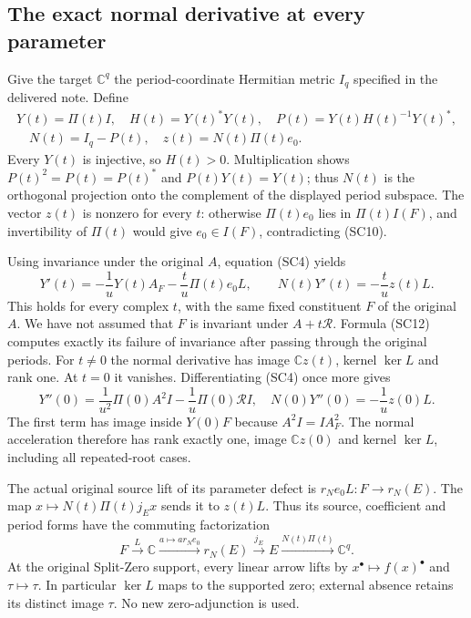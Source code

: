 \subsection{The exact normal derivative at every parameter}

Give the target $\mathbb C^q$ the period-coordinate Hermitian metric
$I_q$ specified in the delivered note.  Define
\[
 \begin{gathered}
 Y(t)=\Pi(t)I,
 \quad H(t)=Y(t)^*Y(t),
 \quad P(t)=Y(t)H(t)^{-1}Y(t)^*,\\
 \quad N(t)=I_q-P(t),
 \quad z(t)=N(t)\Pi(t)e_0.
 \end{gathered}
 \tag{SC11}
\]
Every $Y(t)$ is injective, so $H(t)>0$.  Multiplication shows
$P(t)^2=P(t)=P(t)^*$ and $P(t)Y(t)=Y(t)$; thus $N(t)$ is the
orthogonal projection onto the complement of the displayed period
subspace.  The vector $z(t)$ is nonzero for every $t$: otherwise
$\Pi(t)e_0$ lies in $\Pi(t)I(F)$, and invertibility of $\Pi(t)$ would
give $e_0\in I(F)$, contradicting (SC10).

Using invariance under the original $A$, equation (SC4) yields
\[
 Y'(t)=-\frac1uY(t)A_F-\frac t u\Pi(t)e_0L,
 \qquad
 \boxed{N(t)Y'(t)=-\frac t u z(t)L.}
 \tag{SC12}
\]
This holds for every complex $t$, with the same fixed constituent
$F$ of the original $A$.  We have not assumed that $F$ is invariant
under $A+t\mathcal R$.  Formula (SC12) computes exactly its failure
of invariance after passing through the original periods.  For
$t\ne0$ the normal derivative has image $\mathbb Cz(t)$, kernel
$\ker L$ and rank one.  At $t=0$ it vanishes.  Differentiating
(SC4) once more gives
\[
 Y''(0)=\frac1{u^2}\Pi(0)A^2I-\frac1u\Pi(0)\mathcal RI,
 \quad
 N(0)Y''(0)=-\frac1u z(0)L.
 \tag{SC13}
\]
The first term has image inside $Y(0)F$ because $A^2I=IA_F^2$.
The normal acceleration therefore has rank exactly one, image
$\mathbb Cz(0)$ and kernel $\ker L$, including all repeated-root cases.

The actual original source lift of its parameter defect is
$r_Ne_0L:F\to r_N(E)$.  The map
$x\mapsto N(t)\Pi(t)j_Ex$ sends it to $z(t)L$.
Thus its source, coefficient and period forms have the commuting
factorization
\[
 F\xrightarrow{L}\mathbb C\xrightarrow{a\mapsto ar_Ne_0}r_N(E)
 \xrightarrow{j_E}E\xrightarrow{N(t)\Pi(t)}\mathbb C^q.
 \tag{SC14}
\]
At the original Split-Zero support, every linear arrow lifts by
$x^\bullet\mapsto f(x)^\bullet$ and $\tau\mapsto\tau$.
In particular $\ker L$ maps to the supported zero; external absence
retains its distinct image $\tau$.  No new zero-adjunction is used.

